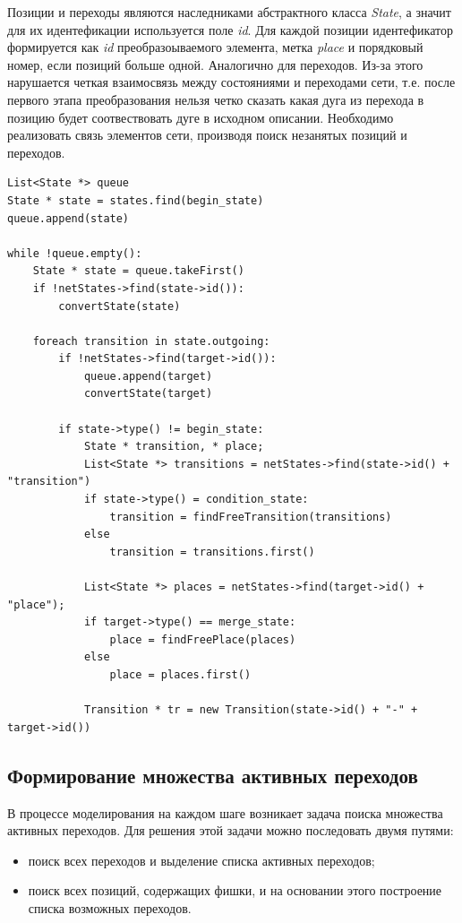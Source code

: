 Позиции и переходы являются наследниками абстрактного класса \textit{State}, а значит для их идентефикации используется поле \textit{id}. Для каждой позиции идентефикатор формируется как \textit{id} преобразоываемого элемента, метка \textit{place} и порядковый номер, если позиций больше одной. Аналогично для переходов. Из-за этого нарушается четкая взаимосвязь между состояниями и переходами сети, т.е. после первого этапа преобразования нельзя четко сказать какая дуга из  перехода в позицию будет соотвествовать дуге в исходном описании. Необходимо реализовать связь элементов сети, производя поиск незанятых позиций и переходов.
\begin{lstlisting}[style=pseudocode,caption={Алгоритм преобразования в простую сеть Петри}]
List<State *> queue
State * state = states.find(begin_state)
queue.append(state)

while !queue.empty():
	State * state = queue.takeFirst()
	if !netStates->find(state->id()):
		convertState(state)

	foreach transition in state.outgoing:
		if !netStates->find(target->id()):
			queue.append(target)
			convertState(target)

		if state->type() != begin_state:
			State * transition, * place;
			List<State *> transitions = netStates->find(state->id() + "transition")
			if state->type() = condition_state:
				transition = findFreeTransition(transitions)
			else
				transition = transitions.first()

			List<State *> places = netStates->find(target->id() +  "place");
			if target->type() == merge_state:
				place = findFreePlace(places)
			else
				place = places.first()

			Transition * tr = new Transition(state->id() + "-" + target->id())
\end{lstlisting}

\subsection{Формирование множества активных переходов}

В процессе моделирования на каждом шаге возникает задача поиска множества активных переходов. Для решения этой задачи можно последовать двумя путями:

\begin{itemize}
\item поиск всех переходов и выделение списка активных переходов;
\item поиск всех позиций, содержащих фишки, и на основании этого построение списка возможных переходов.
\end{itemize}

